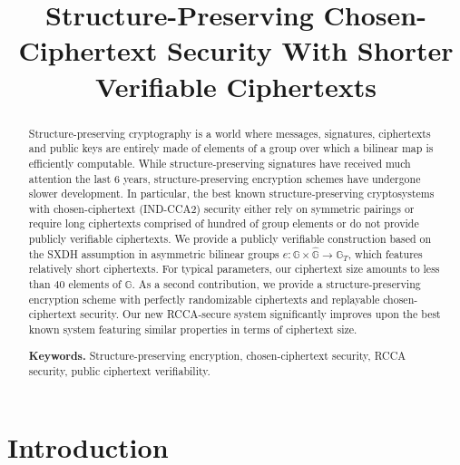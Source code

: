 \documentclass[10pt]{llncs}
\newcommand{\G}{\mathbb{G}}
\begin{document}
\pagestyle{plain}



\title{Structure-Preserving Chosen-Ciphertext Security With   Shorter Verifiable Ciphertexts}

\author{}
 
\institute{}


\maketitle

\begin{abstract} 
 
 
Structure-preserving cryptography is a world where messages, signatures, ciphertexts and public keys are entirely made of 
elements of a group over which a bilinear map is efficiently computable. While structure-preserving signatures have received 
much attention   the last $6$ years, structure-preserving encryption schemes have undergone slower development. 
In particular, the best known  structure-preserving cryptosystems with chosen-ciphertext (IND-CCA2) security either rely on 
symmetric pairings or require 
long ciphertexts comprised of hundred of group elements or do not provide publicly verifiable ciphertexts. We provide a publicly verifiable construction based on the SXDH assumption in asymmetric bilinear groups
 $e : \G \times \hat{\G} \rightarrow \G_T$, 
which features relatively short ciphertexts.   For typical parameters, our ciphertext size amounts to less than $40$ elements of $\G$. 
As a second contribution, we provide a structure-preserving encryption scheme with perfectly randomizable ciphertexts and replayable 
chosen-ciphertext security. Our new RCCA-secure system significantly improves upon the best known system featuring similar properties in terms 
of ciphertext size. \smallskip \smallskip 

\noindent \textbf{Keywords.} Structure-preserving encryption,   chosen-ciphertext security, RCCA security, public ciphertext verifiability.    
 

\end{abstract}



\section{Introduction}
\end{document}
